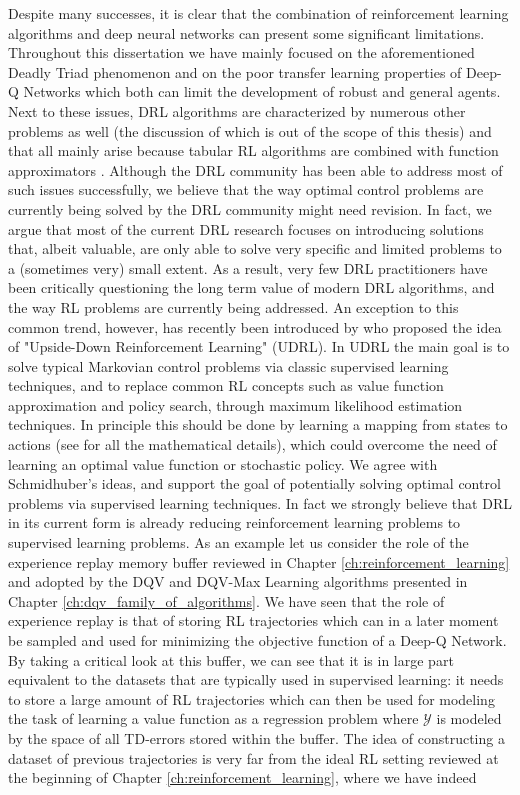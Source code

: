 Despite many successes, it is clear that the combination of reinforcement learning algorithms and deep neural networks can present some significant limitations. Throughout this dissertation we have mainly focused on the aforementioned Deadly Triad phenomenon and on the poor transfer learning properties of Deep-Q Networks which both can limit the development of robust and general agents. Next to these issues, DRL algorithms are characterized by numerous other problems as well (the discussion of which is out of the scope of this thesis) and that all mainly arise because tabular RL algorithms are combined with function approximators \cite{tsitsiklis1997analysis,van2016deep,anschel2017averaged,fujimoto2018addressing,fujimoto2019benchmarking, kumar2019stabilizing, marklundexact}. Although the DRL community has been able to address most of such issues successfully, we believe that the way optimal control problems are currently being solved by the DRL community might need revision. In fact, we argue that most of the current DRL research focuses on introducing solutions that, albeit valuable, are only able to solve very specific and limited problems to a (sometimes very) small extent. As a result, very few DRL practitioners have been critically questioning the long term value of modern DRL algorithms, and the way RL problems are currently being addressed. An exception to this common trend, however, has recently been introduced by \citet{schmidhuber2019reinforcement} who proposed the idea of "Upside-Down Reinforcement Learning" (UDRL). In UDRL the main goal is to solve typical Markovian control problems via classic supervised learning techniques, and to replace common RL concepts such as value function approximation and policy search, through maximum likelihood estimation techniques. In principle this should be done by learning a mapping from states to actions (see \cite{srivastava2019training} for all the mathematical details), which could overcome the need of learning an optimal value function or stochastic policy. We agree with Schmidhuber's ideas, and support the goal of potentially solving optimal control problems via supervised learning techniques. In fact we strongly believe that DRL in its current form is already reducing reinforcement learning problems to supervised learning problems. As an example let us consider the role of the experience replay memory buffer reviewed in Chapter \ref{ch:reinforcement_learning} and adopted by the DQV and DQV-Max Learning algorithms presented in Chapter \ref{ch:dqv_family_of_algorithms}. We have seen that the role of experience replay is that of storing RL trajectories which can in a later moment be sampled and used for minimizing the objective function of a Deep-Q Network. By taking a critical look at this buffer, we can see that it is in large part equivalent to the datasets that are typically used in supervised learning: it needs to store a large amount of RL trajectories which can then be used for modeling the task of learning a value function as a regression problem where $\mathcal{Y}$ is modeled by the space of all TD-errors stored within the buffer. The idea of constructing a dataset of previous trajectories is very far from the ideal RL setting reviewed at the beginning of Chapter \ref{ch:reinforcement_learning}, where we have indeed 